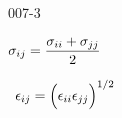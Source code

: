 \begin{mitframe}{007-3} %

    
\begin{listone}
    
    \item $\molecrad_{ij} = \dfrac{\molecrad_{ii}+\molecrad_{jj}}{2}$
	
    
    \item ~$\dielec_{ij} = \Big(\dielec_{ii}\dielec_{jj}\Big)^{1/2} $
    
    
\end{listone}
 
\end{mitframe}